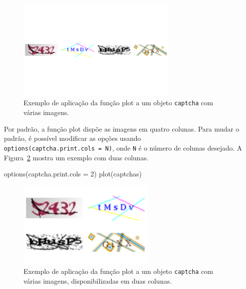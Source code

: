 \documentclass[12pt,twoside,brazilian]{book}
\newenvironment{Shaded}{\begin{snugshade}}{\end{snugshade}}
\newcommand{\AttributeTok}[1]{\textcolor[rgb]{0.40,0.45,0.13}{#1}}
\newcommand{\DecValTok}[1]{\textcolor[rgb]{0.68,0.00,0.00}{#1}}
\newcommand{\FunctionTok}[1]{\textcolor[rgb]{0.28,0.35,0.67}{#1}}
\newcommand{\NormalTok}[1]{\textcolor[rgb]{0.00,0.23,0.31}{#1}}
\begin{document}
\begin{figure}[H]

{\centering \includegraphics[width=0.7\textwidth,height=\textheight]{./resultados_files/figure-pdf/fig-exemplo-plot-multi-1.pdf}

}

\caption{\label{fig-exemplo-plot-multi}Exemplo de aplicação da função
plot a um objeto \texttt{captcha} com várias imagens.}

\end{figure}

Por padrão, a função plot dispõe as imagens em quatro colunas. Para
mudar o padrão, é possível modificar as opções usando
\texttt{options(captcha.print.cols\ =\ N)}, onde \texttt{N} é o número
de colunas desejado. A Figura~\ref{fig-exemplo-plot-multi-2col} mostra
um exemplo com duas colunas.

\begin{Shaded}
\begin{Highlighting}[]
\FunctionTok{options}\NormalTok{(}\AttributeTok{captcha.print.cols =} \DecValTok{2}\NormalTok{)}
\FunctionTok{plot}\NormalTok{(captchas)}
\end{Highlighting}
\end{Shaded}

\begin{figure}[H]

{\centering \includegraphics[width=0.6\textwidth,height=\textheight]{./resultados_files/figure-pdf/fig-exemplo-plot-multi-2col-1.pdf}

}

\caption{\label{fig-exemplo-plot-multi-2col}Exemplo de aplicação da
função plot a um objeto \texttt{captcha} com várias imagens,
disponibilizadas em duas colunas.}

\end{figure}
\end{document}
